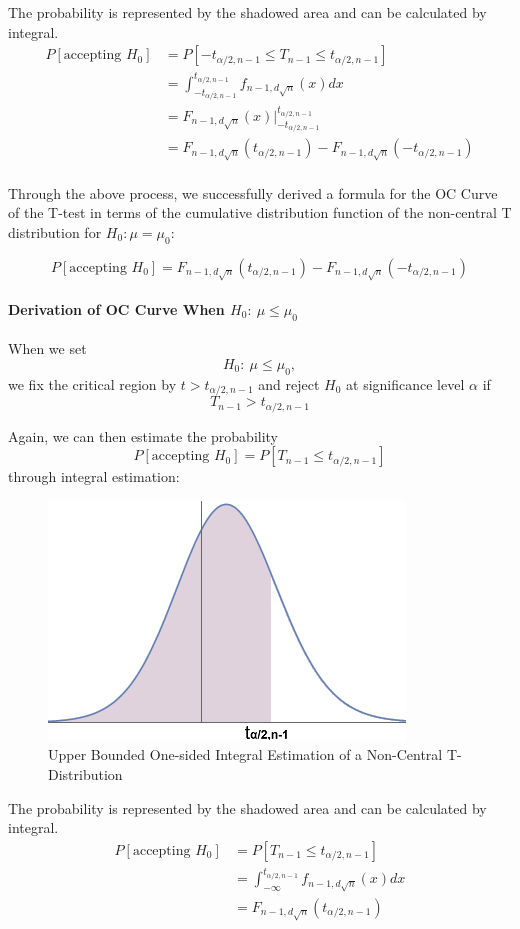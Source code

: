 \documentclass[a4paper]{article}
\begin{document}
The probability is represented by the shadowed area and can be calculated by integral.
\begin{align*}
P[\text{accepting }H_0]
&= P[-t_{\alpha/2,n-1} \leq T_{n-1} \leq t_{\alpha/2,n-1}]\\
&= \int_{-t_{\alpha/2,n-1}}^{t_{\alpha/2,n-1}} f_{n-1,d\sqrt{n}}(x) dx\\
&= F_{n-1,d\sqrt{n}}(x)\big|_{-t_{\alpha/2,n-1}}^{t_{\alpha/2,n-1}}\\
&= F_{n-1,d\sqrt{n}}(t_{\alpha/2,n-1}) - F_{n-1,d\sqrt{n}}(-t_{\alpha/2,n-1})\\
\end{align*}

Through the above process, we successfully derived a formula for the OC Curve of the T-test in terms of the cumulative distribution function of the non-central T distribution for $H_0: \mu=\mu_0$:

$$P[\text{accepting }H_0]= F_{n-1,d\sqrt{n}}(t_{\alpha/2,n-1}) - F_{n-1,d\sqrt{n}}(-t_{\alpha/2,n-1})$$

\paragraph{Derivation of OC Curve When $H_0:\ \mu \leq \mu_0$}
When we set
$$H_0:\ \mu \leq \mu_0,$$
we fix the critical region by $t>t_{\alpha/2,n-1}$ and reject $H_0$ at significance level $\alpha$ if
$$T_{n-1}>t_{\alpha/2,n-1}$$

Again, we can then estimate the probability
$$P[\text{accepting }H_0] = P[T_{n-1} \leq t_{\alpha/2,n-1}]$$ through integral estimation:

\begin{figure}[!htbp] 
\centering 
\includegraphics[width=0.6\linewidth]{nct1u.png}  
\caption{Upper Bounded One-sided Integral Estimation of a Non-Central T-Distribution} 
\end{figure}

The probability is represented by the shadowed area and can be calculated by integral.
\begin{align*}
P[\text{accepting }H_0]
&= P[T_{n-1} \leq t_{\alpha/2,n-1}]\\
&= \int_{-\infty}^{t_{\alpha/2,n-1}} f_{n-1,d\sqrt{n}}(x) dx\\
&= F_{n-1,d\sqrt{n}}(t_{\alpha/2,n-1})
\end{align*}
\end{document}
